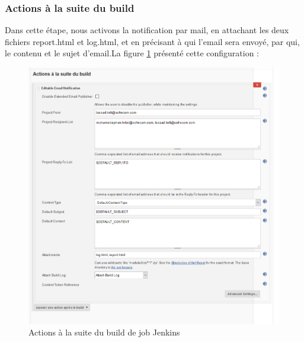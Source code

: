 \subsubsection{Actions à la suite du build}
Dans cette étape, nous activons la notification par mail, en attachant les  deux fichiers report.html et log.html, et en précisant à qui l'email sera envoyé, par qui, le contenu et le sujet d'email.\newpage La figure \ref{fig:actions-after} présenté cette configuration :
\begin{figure}[H]
	\centering
	\includegraphics[width=1\linewidth]{"img/jenkins/actions after"}
	\caption[Actions à la suite du build de job Jenkins]{Actions à la suite du build de job Jenkins}
	\label{fig:actions-after}
\end{figure}

